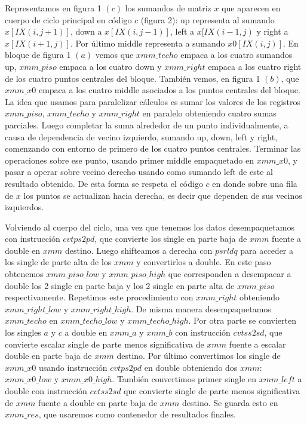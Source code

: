 Representamos en figura 1 $(c)$ los sumandos de matriz $x$ que aparecen en cuerpo de ciclo principal 
 en código $c$ (figura 2):
 up representa al sumando $x[IX(i,j+1)]$, down a $x[IX(i,j-1)]$, left a $x[IX(i-1,j)$ y right a 
 $x[IX(i+1,j)]$. Por último middle representa a sumando $x0[IX(i,j)]$. En bloque de figura 1 $(a)$ vemos que $xmm\_techo$ empaca a los cuatro sumandos up, $xmm\_piso$
  empaca a los cuatro down y $xmm\_right$ empaca a los cuatro right de los cuatro puntos centrales del bloque. También vemos, en figura 1 $(b)$, que $xmm\_x0$ empaca a los cuatro middle asociados a los puntos centrales del bloque.
  La idea que usamos para paralelizar cálculos es sumar los valores de los registros $xmm\_piso$,
  $xmm\_techo$ y $xmm\_right$ en paralelo obteniendo cuatro sumas parciales.
  Luego completar la suma alrededor de un punto individualmente, a causa de dependencia de
  vecino izquierdo, sumando up, down, left y right, comenzando con entorno de primero de los cuatro puntos
  centrales. Terminar las operaciones sobre ese punto, usando primer middle empaquetado en $xmm\_x0$, y pasar a operar sobre vecino derecho 
  usando como sumando left de este al resultado obtenido.
  De esta forma se respeta el código $c$ en donde sobre una fila de $x$ los 
 puntos se actualizan hacia derecha, es decir que dependen de sus vecinos izquierdos.
  
 Volviendo al cuerpo del ciclo, una vez que tenemos los datos desempaquetamos con instrucción $cvtps2pd$, que convierte los single
 en parte baja de $xmm$ fuente a double en $xmm$ destino. Luego shifteamos a derecha con $psrldq$ para
 acceder a los single de parte alta de los $xmm$ y convertirlos a double. En este paso obtenemos 
 $xmm\_piso\_low$ y $xmm\_piso\_high$ que corresponden a desempacar a double los 2 single en parte baja y los 
 2 single en parte alta de $xmm\_piso$ respectivamente.
Repetimos este procedimiento con $xmm\_right$ obteniendo 
 $xmm\_right\_low$ y $xmm\_right\_high$. De misma manera desempaquetamos 
 $xmm\_techo$ en $xmm\_techo\_low$ y $xmm\_techo\_high$.
 Por otra parte se convierten los singles $a$ y $c$ a double en $xmm\_a$ y $xmm\_b$ con instrucción
 $cvtss2sd$, que convierte escalar single de parte menos significativa de $xmm$ fuente a
 escalar double en parte baja de $xmm$ destino. 
 Por último convertimos los single de $xmm\_x0$ usando instrucción $cvtps2pd$ en double obteniendo dos
 $xmm$: $xmm\_x0\_low$ y $xmm\_x0\_high$. También convertimos primer single en $xmm\_left$ a double con instrucción $cvtss2sd$ que convierte single
 de parte menos significativa de $xmm$ fuente a double en parte baja de $xmm$ destino. Se guarda esto en
 $xmm\_res$, que usaremos como contenedor de resultados finales.

